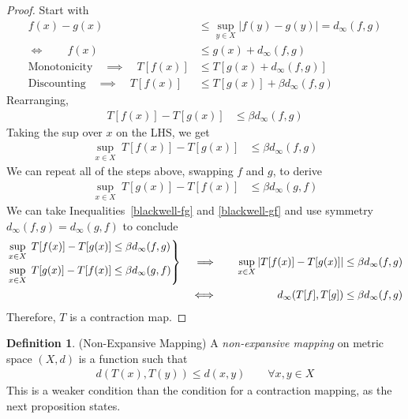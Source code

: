 \documentclass[12pt]{article}
\numberwithin{equation}{section} %
\theoremstyle{plain}
\theoremstyle{definition}
\newtheorem{defn}[thm]{Definition}
\theoremstyle{remark}
\newenvironment{rcases}
  {\left.\begin{aligned}}
  {\end{aligned}\right\rbrace}
\begin{document}
\begin{proof}
Start with
\begin{align*}
  f(x)-g(x) &\leq \sup_{y\in X} |f(y)-g(y)| = d_\infty(f,g) \\
  \iff\qquad
  f(x) &\leq g(x) + d_\infty(f,g) \\
  \text{Monotonicity} \quad
  \implies\quad
  T[f(x)] &\leq T[g(x) + d_\infty(f,g)]
  \\
  \text{Discounting} \quad
  \implies\quad
  T[f(x)] &\leq T[g(x)] + \beta d_\infty(f,g)
\end{align*}
Rearranging,
\begin{align*}
  T[f(x)] - T[g(x)] &\leq \beta d_\infty(f,g)
\end{align*}
Taking the sup over $x$ on the LHS, we get
\begin{align}
  \sup_{x\in X} \; T[f(x)] - T[g(x)] &\leq \beta d_\infty(f,g)
  \label{blackwell-fg}
\end{align}
We can repeat all of the steps above, swapping $f$ and $g$, to derive
\begin{align}
  \sup_{x\in X} \; T[g(x)] - T[f(x)] &\leq \beta d_\infty(g,f)
  \label{blackwell-gf}
\end{align}
We can take Inequalities~\ref{blackwell-fg} and \ref{blackwell-gf} and
use symmetry $d_\infty(f,g)=d_\infty(g,f)$ to conclude
\begin{alignat*}{3}
  \begin{rcases}
  \sup_{x\in X} \; T[f(x)] - T[g(x)] &\leq \beta d_\infty(f,g)
  \\
  \sup_{x\in X} \; T[g(x)] - T[f(x)] &\leq \beta d_\infty(g,f)
  \end{rcases}
  \quad\implies&&\quad
  \sup_{x\in X} \left\lvert T[f(x)] - T[g(x)]\right\rvert
    &\leq \beta d_\infty(f,g) \\
  \iff&&\qquad
  d_\infty(T[f],T[g])
  &\leq \beta d_\infty(f,g)
\end{alignat*}
Therefore, $T$ is a contraction map.
\end{proof}

\begin{defn}(Non-Expansive Mapping)
A \emph{non-expansive mapping} on metric space $(X,d)$ is a function
such that
\begin{align*}
  d(T(x),T(y)) \leq d(x,y)
  \qquad\forall x,y\in X
\end{align*}
This is a weaker condition than the condition for a contraction mapping,
as the next proposition states.
\end{defn}
\end{document}
